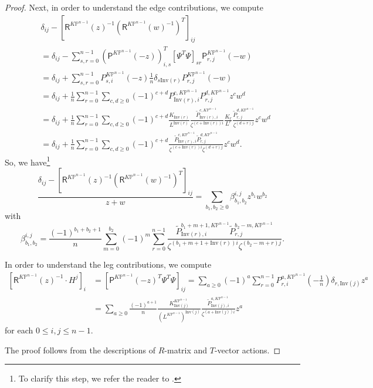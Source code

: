 \documentclass[12pt]{amsart}
\numberwithin{equation}{section}
\newcommand{\KP}{K\mathbb{P}}
\begin{document}
\begin{proof}
Next, in order to understand the edge contributions, we compute
\begin{equation}\label{eq:contproofeq9}
\begin{split}
&{\delta_{ij}-{\left[\mathsf{R}^{\KP^{n-1}}(z)^{-1}\left(\mathsf{R}^{\KP^{n-1}}(w)^{-1}\right)^T\right]}_{ij}}\\
&=\delta_{ij}-\sum_{s,r=0}^{n-1}\left(\mathsf{P}^{\KP^{n-1}}(-z)\right)_{i,s}^T\left[\Psi^T\Psi\right]_{sr} \mathsf{P}^{\KP^{n-1}}_{r,j}(-w)\\
&=\delta_{ij}+\sum_{s,r=0}^{n-1}P^{\KP^{n-1}}_{s,i}(-z)\frac{1}{n}\delta_{s\mathrm{Inv}(r)} P^{\KP^{n-1}}_{r,j}(-w)\\
&=\delta_{ij}+\frac{1}{n}\sum_{r=0}^{n-1}\sum_{c,d\geq{0}}(-1)^{c+d}P^{c,\KP^{n-1}}_{\mathrm{Inv}(r),i}P^{d,\KP^{n-1}}_{r,j}z^cw^d\\
&=\delta_{ij}+\frac{1}{n}\sum_{r=0}^{n-1}\sum_{c,d\geq{0}}(-1)^{c+d}\frac{K_{\mathrm{Inv}(r)}}{L^{\mathrm{Inv}(r)}}\frac{\widetilde{P}^{c,\KP^{n-1}}_{\mathrm{Inv}(r),i}}{\zeta^{(c+\mathrm{Inv}(r))i}}\frac{K_r}{L^r}\frac{\widetilde{P}^{d,\KP^{n-1}}_{r,j}}{\zeta^{(d+r)j}}z^cw^d\\
&=\delta_{ij}+\frac{1}{n}\sum_{r=0}^{n-1}\sum_{c,d\geq{0}}(-1)^{c+d}\frac{\widetilde{P}^{c,\KP^{n-1}}_{\mathrm{Inv}(r),i}\widetilde{P}^{d,\KP^{n-1}}_{r,j}}{\zeta^{(c+\mathrm{Inv}(r))i}\zeta^{(d+r)j}}z^cw^d.
\end{split}
\end{equation}
So, we have\footnote{To clarify this step, we refer the reader to \cite[Equation 3.20]{gt}.}
\begin{equation}\label{eq:contproofeq10}
\frac{{\delta_{ij}-{\left[\mathsf{R}^{\KP^{n-1}}(z)^{-1}\left(\mathsf{R}^{\KP^{n-1}}(w)^{-1}\right)^T\right]}_{ij}}}{z+w}=\sum_{b_1,b_2\geq{0}}\beta^{i,j}_{b_1,b_2}z^{b_1}w^{b_2}
\end{equation}
with
\begin{equation}\label{eq:contproofeq11}
\beta^{i,j}_{b_1,b_2}=\frac{(-1)^{b_1+b_2+1}}{n}\sum_{m=0}^{b_2}(-1)^m\sum_{r=0}^{n-1}\frac{\widetilde{P}^{b_1+m+1,\KP^{n-1}}_{\mathrm{Inv}(r),i}\widetilde{P}^{b_2-m,\KP^{n-1}}_{r,j}}{\zeta^{(b_1+m+1+\mathrm{Inv}(r))i}\zeta^{(b_2-m+r)j}}.
\end{equation}

In order to understand the leg contributions, we compute 
\begin{equation}\label{eq:contproofeq12}
\begin{split}
\left[\mathsf{R}^{\KP^{n-1}}(z)^{-1}\cdot H^j\right]_i
&=\left[\mathsf{P}^{\KP^{n-1}}(-z)^T\Psi^T\Psi\right]_{ij}=\sum_{a\geq{0}}(-1)^a\sum_{r=0}^{n-1}P_{r,i}^{a,\KP^{n-1}}\left(-\frac{1}{n}\right)\delta_{r,\mathrm{Inv}(j)}z^a\\
&=\sum_{a\geq{0}}\frac{(-1)^{a+1}}{n}\frac{K^{\KP^{n-1}}_{\mathrm{Inv}(j)}}{(L^{\KP^{n-1}})^{\mathrm{Inv}(j)}}\frac{\widetilde{P}^{a,\KP^{n-1}}_{\mathrm{Inv}(j),i}}{\zeta^{(a+\mathrm{Inv}(j))i}}z^a
\end{split}
\end{equation}
for each $0\leq{i,j}\leq{n-1}$.

The proof follows from the descriptions of $R$-matrix and $T$-vector actions.
\end{proof}
\end{document}
